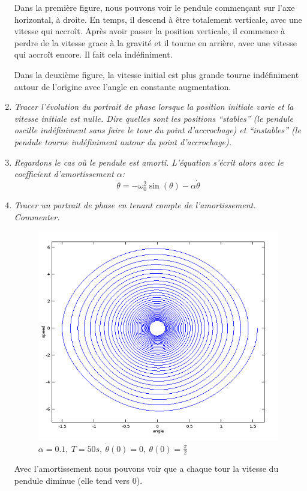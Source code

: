 \documentclass[a4paper,10pt]{article}
\begin{document}
\begin{enumerate}
    Dans la première figure, nous pouvons voir le pendule commençant sur ​​l'axe
    horizontal, à droite. En temps, il descend à être totalement verticale, avec une
    vitesse qui accroît. Après avoir passer la position verticale, il commence à
    perdre de la vitesse grace à la gravité et il tourne en arrière, avec une vitesse
    qui accroît encore. Il fait cela indéfiniment.

    Dans la deuxième figure, la vitesse initial est plus grande tourne indéfiniment
    autour de l'origine avec l'angle en constante augmentation.

    \item \emph{Tracer l'évolution du portrait de phase lorsque la position initiale
    varie et la vitesse initiale est nulle. Dire quelles sont les positions
    ``stables'' (le pendule oscille indéfiniment sans faire le tour du point
    d'accrochage) et ``instables'' (le pendule tourne indéfiniment autour du point
    d’accrochage).}

    \item \emph{Regardons le cas où le pendule est amorti. L'équation s'écrit alors avec
    le coefficient d'amortissement $\alpha$:}
\[
    \ddot{\theta} = -\omega_0^2 \sin(\theta) - \alpha \dot{\theta}
\]

    \item \emph{Tracer un portrait de phase en tenant compte de l'amortissement.
    Commenter.}
\clearpage
\begin{figure}[h!]
    \centering
    \includegraphics[scale=0.7]{./img/pendulum-friction.png}
    \caption{$\alpha = 0.1,~T = 50s,~\dot{\theta}(0) = 0,~\theta(0) = \frac{\pi}{2}$}
\end{figure}

    Avec l'amortissement nous pouvons voir que a chaque tour la vitesse du pendule
    diminue (elle tend vers 0).

\end{enumerate}
\end{document}
